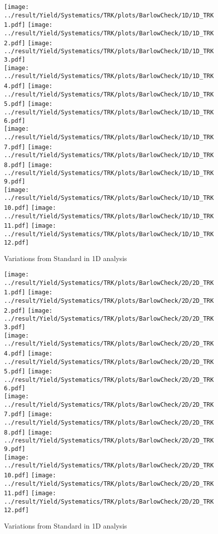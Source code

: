 \newpage
\begin{figure}
	\centering
		\texttt{[image: ../result/Yield/Systematics/TRK/plots/BarlowCheck/1D/1D\_TRK1.pdf]}
		\texttt{[image: ../result/Yield/Systematics/TRK/plots/BarlowCheck/1D/1D\_TRK2.pdf]}
		\texttt{[image: ../result/Yield/Systematics/TRK/plots/BarlowCheck/1D/1D\_TRK3.pdf]}\\
		\texttt{[image: ../result/Yield/Systematics/TRK/plots/BarlowCheck/1D/1D\_TRK4.pdf]}
		\texttt{[image: ../result/Yield/Systematics/TRK/plots/BarlowCheck/1D/1D\_TRK5.pdf]}
		\texttt{[image: ../result/Yield/Systematics/TRK/plots/BarlowCheck/1D/1D\_TRK6.pdf]}\\
		\texttt{[image: ../result/Yield/Systematics/TRK/plots/BarlowCheck/1D/1D\_TRK7.pdf]}
		\texttt{[image: ../result/Yield/Systematics/TRK/plots/BarlowCheck/1D/1D\_TRK8.pdf]}
		\texttt{[image: ../result/Yield/Systematics/TRK/plots/BarlowCheck/1D/1D\_TRK9.pdf]}\\
		\texttt{[image: ../result/Yield/Systematics/TRK/plots/BarlowCheck/1D/1D\_TRK10.pdf]}
		\texttt{[image: ../result/Yield/Systematics/TRK/plots/BarlowCheck/1D/1D\_TRK11.pdf]}
		\texttt{[image: ../result/Yield/Systematics/TRK/plots/BarlowCheck/1D/1D\_TRK12.pdf]}
		\caption{Variations from Standard in 1D analysis}
		\label{}
\end{figure}

\newpage
\begin{figure}
	\centering
		\texttt{[image: ../result/Yield/Systematics/TRK/plots/BarlowCheck/2D/2D\_TRK1.pdf]}
		\texttt{[image: ../result/Yield/Systematics/TRK/plots/BarlowCheck/2D/2D\_TRK2.pdf]}
		\texttt{[image: ../result/Yield/Systematics/TRK/plots/BarlowCheck/2D/2D\_TRK3.pdf]}\\
		\texttt{[image: ../result/Yield/Systematics/TRK/plots/BarlowCheck/2D/2D\_TRK4.pdf]}
		\texttt{[image: ../result/Yield/Systematics/TRK/plots/BarlowCheck/2D/2D\_TRK5.pdf]}
		\texttt{[image: ../result/Yield/Systematics/TRK/plots/BarlowCheck/2D/2D\_TRK6.pdf]}\\
		\texttt{[image: ../result/Yield/Systematics/TRK/plots/BarlowCheck/2D/2D\_TRK7.pdf]}
		\texttt{[image: ../result/Yield/Systematics/TRK/plots/BarlowCheck/2D/2D\_TRK8.pdf]}
		\texttt{[image: ../result/Yield/Systematics/TRK/plots/BarlowCheck/2D/2D\_TRK9.pdf]}\\
		\texttt{[image: ../result/Yield/Systematics/TRK/plots/BarlowCheck/2D/2D\_TRK10.pdf]}
		\texttt{[image: ../result/Yield/Systematics/TRK/plots/BarlowCheck/2D/2D\_TRK11.pdf]}
		\texttt{[image: ../result/Yield/Systematics/TRK/plots/BarlowCheck/2D/2D\_TRK12.pdf]}
		\caption{Variations from Standard in 1D analysis}
		\label{}
\end{figure}

